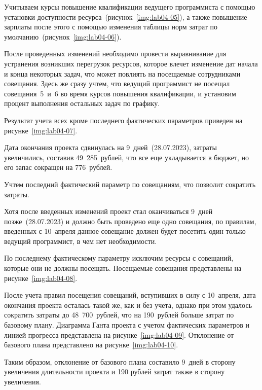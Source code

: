 
Учитываем курсы повышение квалификации ведущего программиста с помощью
установки доступности ресурса~(рисунок~\ref{img:lab04-05}), а также повышение
зарплаты после этого с помощью изменения таблицы норм затрат по
умолчанию~(рисунок~\ref{img:lab04-06}).



После проведенных изменений необходимо провести выравнивание для устранения
возникших перегрузок ресурсов, которое влечет изменение дат начала и конца
некоторых задач, что может повлиять на посещаемые сотрудниками совещания.  Здесь
же сразу учтем, что ведущий программист не посещал совещания~5~и~6 во время
курсов повышения квалификации, и установим процент выполнения остальных задач по
графику.

Результат учета всех кроме последнего фактических параметров приведен на
рисунке~\ref{img:lab04-07}.


Дата окончания проекта сдвинулась на 9~дней~(28.07.2023), затраты увеличились,
составив 49~285~рублей, что все еще укладывается в бюджет, но его запас сокращен
на 776~рублей.

Учтем последний фактический параметр по совещаниям, что позволит сократить
затраты.

Хотя после введенных изменений проект стал оканчиваться 9~дней
позже~(28.07.2023) и должно быть проведено еще одно совещания, по правилам,
введенных с 10~апреля данное совещание должен будет посетить один только ведущий
программист, в чем нет необходимости. 

По последнему фактическому параметру исключим ресурсы с совещаний, которые они
не должны посещать. Посещаемые совещания представлены на
рисунке~\ref{img:lab04-08}.


После учета правил посещения совещаний, вступивших в силу с 10~апреля, дата
окончания проекта осталась такой же, как и без учета, однако при этом удалось
сократить затраты до 48~700~рублей, что на 190~рублей больше затрат по базовому
плану. Диаграмма Ганта проекта с учетом фактических параметров и линией
прогресса представлена на рисунке~\ref{img:lab04-09}. Отклонение от базового
плана представлено на рисунке~\ref{img:lab04-10}.



Таким образом, отклонение от базового плана составило 9~дней в сторону
увеличения длительности проекта и 190 рублей затрат также в сторону увеличения.

